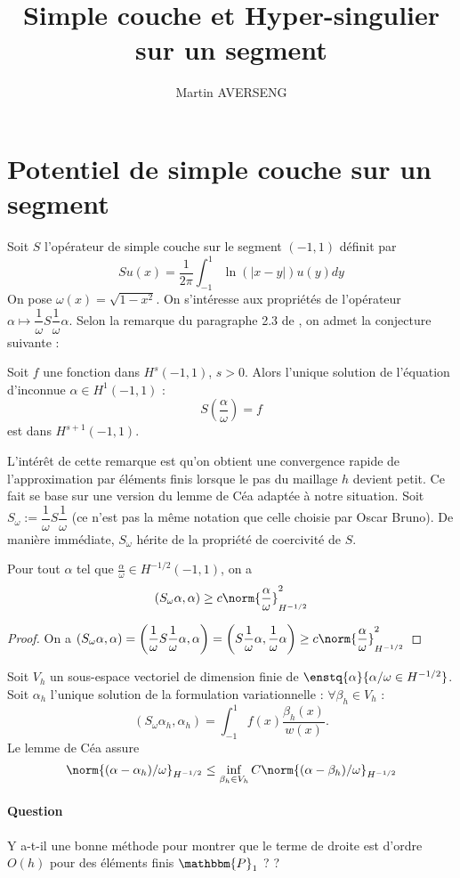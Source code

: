 \documentclass[11pt,a4paper]{article}
\author{Martin AVERSENG}
\title{Simple couche et Hyper-singulier sur un segment}
\begin{document}
\maketitle	

\section{Potentiel de simple couche sur un segment}

Soit $S$ l'opérateur de simple couche sur le segment $(-1,1)$ définit par
\[Su(x) = \dfrac{1}{2\pi}\int_{-1}^1 \ln(|x-y|)u(y)dy\]
On pose $\omega(x)= \sqrt{1-x^2}$. 
On s'intéresse aux propriétés de l'opérateur $\alpha \mapsto \dfrac{1}{\omega} S \dfrac{1}{\omega}\alpha$. Selon la remarque du paragraphe 2.3 de \cite{bruno2012second}, on admet la conjecture suivante :
\begin{The} Soit $f$ une fonction dans $H^s(-1,1)$, $s>0$. Alors l'unique solution de l'équation d'inconnue $\alpha \in H^1(-1,1)$ :
\[S\left(\dfrac{\alpha}{\omega}\right) = f\]
est dans $H^{s+1}(-1,1)$. 
\end{The}
L'intérêt de cette remarque est qu'on obtient une convergence rapide de l'approximation par éléments finis lorsque le pas du maillage $h$ devient petit. Ce fait se base sur une version du lemme de Céa adaptée à notre situation.
Soit $S_{\omega} := \dfrac{1}{\omega}S\dfrac{1}{\omega}$ (ce n'est pas la même notation que celle choisie par Oscar Bruno). De manière immédiate, $S_\omega$ hérite de la propriété de coercivité de $S$. 
\begin{Prop} Pour tout $\alpha$ tel que $\frac{\alpha}{\omega} \in H^{-1/2}(-1,1)$, on a 
\[ (S_\omega \alpha,\alpha) \geq c \norm{\frac{\alpha}{\omega}}_{H^{-1/2}}^2\] 
\begin{proof}
On a
$(S_{\omega}\alpha,\alpha) = \left(\dfrac{1}{\omega}S\dfrac{1}{\omega}\alpha , \alpha\right) = \left(S\dfrac{1}{\omega}\alpha , \dfrac{1}{\omega}\alpha\right) \geq c \norm{\dfrac{\alpha}{\omega}}_{H^{-1/2}}^2$
\end{proof}
\end{Prop}
Soit $V_h$ un sous-espace vectoriel de dimension finie de $\enstq{\alpha}{\alpha/\omega \in H^{-1/2}}$. Soit $\alpha_h$ l'unique solution de la formulation variationnelle : $\forall \beta_h \in V_h$ : 
\[(S_\omega\alpha_h,\alpha_h) = \int_{-1}^{1} f(x)\dfrac{\beta_h(x)}{w(x)}.\]
Le lemme de Céa assure 
\[\norm{(\alpha - \alpha_h)/\omega}_{H^{-1/2}} \leq \inf_{\beta_h \in V_h}C\norm{(\alpha-\beta_h)/\omega}_{H^{-1/2}}\]
\paragraph{Question} Y a-t-il une bonne méthode pour montrer que le terme de droite est d'ordre $O(h)$ pour des éléments finis $\mathbbm{P}_1$ ? ?
\end{document}

